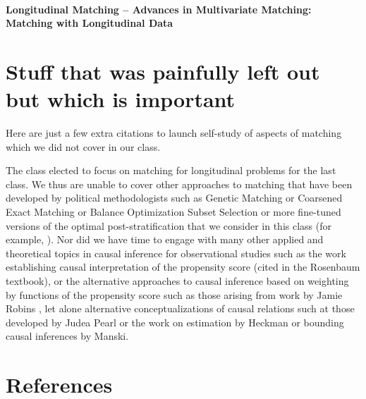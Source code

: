 \documentclass[10pt, letterpaper]{article}
\begin{document}
\paragraph{Longitudinal Matching -- Advances in Multivariate Matching: Matching with Longitudinal Data}
\citealp[Chap 12]{rosenbaum2010design}


\section{Stuff that was painfully left out but which is important}

Here are just a few extra citations to launch self-study of aspects of
matching which we did not cover in our class.

The class elected to focus on matching for longitudinal problems for
the last class. We thus are unable to cover other approaches to
matching that have been developed by political methodologists such as
Genetic Matching \citep{diamond2006genetic, sekhon2007multivariate} or
Coarsened Exact Matching \citep{iacus2009causal,
  iacus2011multivariate} or Balance Optimization Subset Selection
\citep{Nikolaevetal:12} or more fine-tuned versions of the optimal
post-stratification that we consider in this class (for example,
\citep{zubizarreta2012using}). Nor did we have time to engage with
many other applied and theoretical topics in causal inference for
observational studies such as the work establishing causal
interpretation of the propensity score (cited in the Rosenbaum
textbook), or the alternative approaches to causal inference based on
weighting by functions of the propensity score such as those arising
from work by Jamie Robins \citep{glynn2010introduction}, let alone
alternative conceptualizations of causal relations such at those
developed by Judea Pearl \citep{JudeaPearl2000a} or the work on
estimation by Heckman or bounding causal inferences by Manski.


\section{References}


\end{document}
